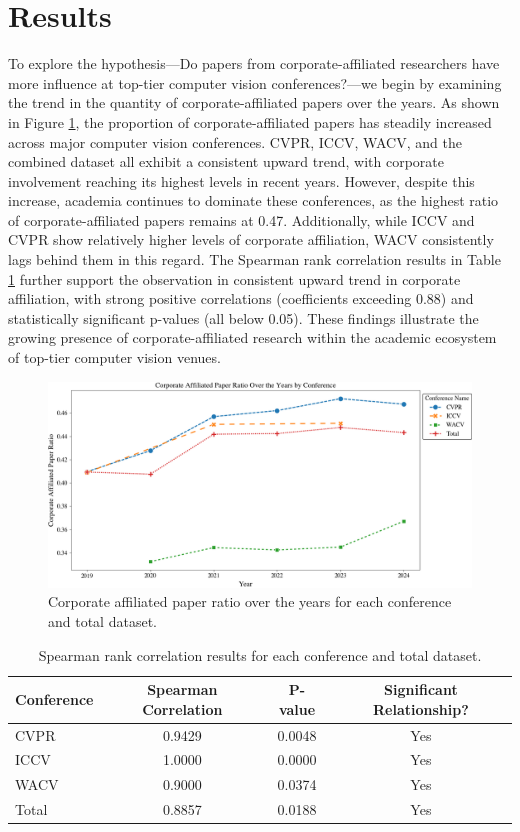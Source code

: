 \documentclass{article}
\begin{document}
\section{Results}
To explore the hypothesis—Do papers from corporate-affiliated researchers have more influence at top-tier computer vision conferences?—we begin by examining the trend in the quantity of corporate-affiliated papers over the years. As shown in Figure \ref{fig:corporate_ratio_graph}, the proportion of corporate-affiliated papers has steadily increased across major computer vision conferences. CVPR, ICCV, WACV, and the combined dataset all exhibit a consistent upward trend, with corporate involvement reaching its highest levels in recent years. However, despite this increase, academia continues to dominate these conferences, as the highest ratio of corporate-affiliated papers remains at 0.47. Additionally, while ICCV and CVPR show relatively higher levels of corporate affiliation, WACV consistently lags behind them in this regard. The Spearman rank correlation results in Table \ref{tab:spearman_results} further support the observation in consistent upward trend in corporate affiliation, with strong positive correlations (coefficients exceeding 0.88) and statistically significant p-values (all below 0.05). These findings illustrate the growing presence of corporate-affiliated research within the academic ecosystem of top-tier computer vision venues.

\begin{figure}[ht]
  \centering
  \includegraphics[width=\textwidth]{report/images/corporate_ratio_graph_final.png}  
  \caption{Corporate affiliated paper ratio over the years for each conference and total dataset.}
  \label{fig:corporate_ratio_graph}
\end{figure}

\begin{table}[ht]
\centering
\begin{tabular}{|l|c|c|c|}
\hline
\textbf{Conference} & \textbf{Spearman Correlation} & \textbf{P-value} & \textbf{Significant Relationship?} \\ \hline
CVPR & 0.9429 & 0.0048 & Yes \\ \hline
ICCV & 1.0000 & 0.0000 & Yes \\ \hline
WACV & 0.9000 & 0.0374 & Yes \\ \hline
Total & 0.8857 & 0.0188 & Yes \\ \hline
\end{tabular}
\caption{Spearman rank correlation results for each conference and total dataset.}
\label{tab:spearman_results}
\end{table}
\end{document}
